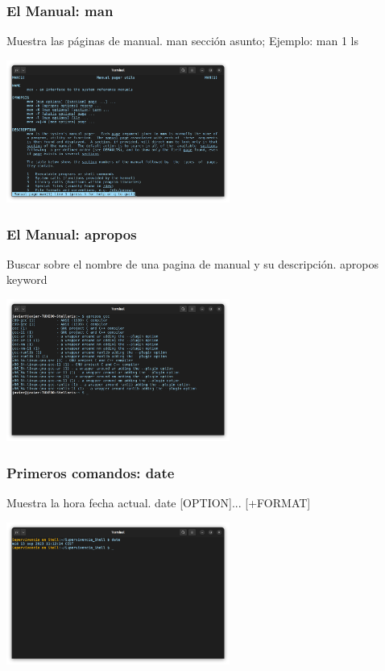 \documentclass[10pt]{beamer}
\begin{document}
	\begin{frame}
		\frametitle{El Manual: man}
		\begin{alertblock}{Muestra las páginas de manual.}
			man sección asunto;    Ejemplo: man 1 ls
		\end{alertblock}
		\begin{center}
			\includegraphics[width=0.55\textwidth]{man}
		\end{center}
	\end{frame}
	
	\begin{frame}
		\frametitle{El Manual: apropos}
		\begin{alertblock}{Buscar sobre el nombre de una pagina de manual y su descripción.}
			apropos keyword
		\end{alertblock}
		\begin{center}
			\includegraphics[width=0.55\textwidth]{apropos}
		\end{center}
	\end{frame}

	\begin{frame}
		\frametitle{Primeros comandos: date}
		\begin{alertblock}{Muestra la hora fecha actual.}
			date [OPTION]... [+FORMAT]
		\end{alertblock}
		\begin{center}
			\includegraphics[width=0.55\textwidth]{date}
		\end{center}
	\end{frame}
	
\end{document}
